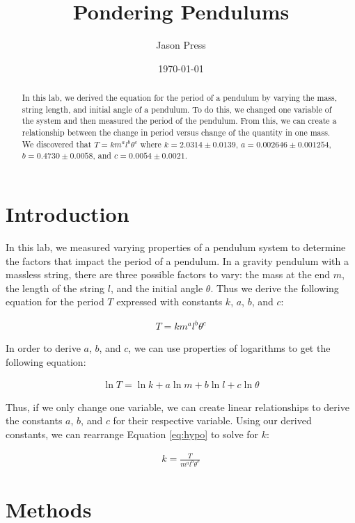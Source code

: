 \documentclass[12pt]{article}
\author{Jason Press}
\date{\today}
\title{Pondering Pendulums}
\begin{document}
\maketitle
\begin{abstract}
In this lab, we derived the equation for the period of a pendulum by varying the mass, string length, and initial angle of a pendulum. To do this, we changed one variable of the system and then measured the period of the pendulum. From this, we can create a relationship between the change in period versus change of the quantity in one mass. We discovered that \(T = km^al^b\theta^c\) where \(k = 2.0314\pm0.0139\), \(a = 0.002646\pm0.001254\), \(b = 0.4730\pm0.0058\), and \(c = 0.0054\pm0.0021\).
\end{abstract}
\section{Introduction}
\label{sec:org265789b}

In this lab, we measured varying properties of a pendulum system to determine the factors that impact the period of a pendulum. In a gravity pendulum with a massless string, there are three possible factors to vary: the mass at the end \(m\), the length of the string \(l\), and the initial angle \(\theta\). Thus we derive the following equation for the period \(T\) expressed with constants \(k\), \(a\), \(b\), and \(c\):

\begin{align}\label{eq:hypo}
T = km^al^b\theta^c
\end{align}

In order to derive \(a\), \(b\), and \(c\), we can use properties of logarithms to get the following equation:

\begin{align}
\ln T = \ln k + a \ln m + b \ln l + c \ln \theta
\end{align}

Thus, if we only change one variable, we can create linear relationships to derive the constants \(a\), \(b\), and \(c\) for their respective variable. Using our derived constants, we can rearrange Equation \ref{eq:hypo} to solve for \(k\):

\begin{align}\label{eq:k}
k = \frac{T}{m^a l^b \theta^c}
\end{align}
\section{Methods}
\label{sec:orgf8875db}
\end{document}
